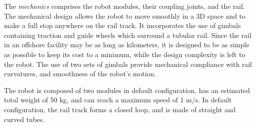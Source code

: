 \documentclass{ifacconf}
\begin{document}
%

The \emph{mechanics} comprises the robot modules, their coupling joints, and the
rail. The mechanical design allows the robot to move smoothly in a 3D space and
to make a full stop anywhere on the rail track. It incorporates the use of
gimbals containing traction and guide wheels which surround a tubular rail.
Since the rail in an offshore facility may be as long as kilometers, it is
designed to be as simple as possible to keep its cost to a minimum, while the
design complexity is left to the robot. The use of two sets of gimbals provide
mechanical compliance with rail curvatures, and smoothness of the robot's
motion.

The robot is composed of two modules in default configuration, has an estimated
total weight of 50 kg, and can reach a maximum speed of 1 m/s. In default
configuration, the rail track forms a closed loop, and is made of straight and 
curved tubes.
\end{document}
